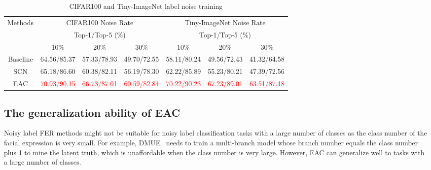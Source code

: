 \documentclass[runningheads]{llncs}
\begin{document}
\begin{table}[!b]
\begin{center}
\setlength{\tabcolsep}{1.8pt}
\caption{CIFAR100 and Tiny-ImageNet label noise training}
\label{table:generalization}

\begin{tabular}{c|llllll}
\hline
\multirow{3}{*}{Methods} & \multicolumn{3}{c|}{CIFAR100 Noise Rate}                                 & \multicolumn{3}{c}{Tiny-ImageNet Noise Rate}                             \\ \cline{2-7} 
                         & \multicolumn{3}{c|}{Top-1/Top-5 (\%)}                                         & \multicolumn{3}{c}{Top-1/Top-5 (\%)}                                          \\ \cline{2-7} 
                         & \multicolumn{1}{c}{10\%} & \multicolumn{1}{c}{20\%} & \multicolumn{1}{c}{30\%} & \multicolumn{1}{c}{10\%} & \multicolumn{1}{c}{20\%} & \multicolumn{1}{c}{30\%} \\ \hline
Baseline                 &     64.56/85.37                   &         57.33/78.93               &      49.70/72.55                  &    58.11/80.24                    &        49.56/72.43                &         41.32/64.58               \\
SCN\cite{wang2020suppressing}                    &     65.18/86.60                   &    60.38/82.11                    &         56.19/78.30               &               62.22/85.89         &        55.23/80.21                &     47.39/72.56                  \\
EAC                      &       \textcolor{red}{70.93/90.15}                 &       \textcolor{red}{66.73/87.01}                 &       \textcolor{red}{60.59/82.84}                 &    \textcolor{red}{70.22/90.23}                    &      \textcolor{red}{67.23/89.01}                  &          \textcolor{red}{63.51/87.18}              \\ \hline
\end{tabular}

\end{center}
\end{table}


\subsection{The generalization ability of EAC}

Noisy label FER methods might not be suitable for noisy label classification tasks with a large number of classes as the class number of the facial expression is very small. For example, DMUE~\cite{she2021dive} needs to train a multi-branch model whose branch number equals the class number plus 1 to mine the latent truth, which is unaffordable when the class number is very large. However, EAC can generalize well to tasks with a large number of classes.
\end{document}
